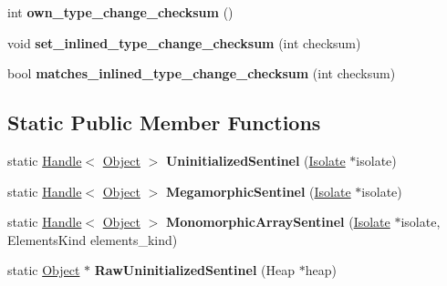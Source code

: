 \begin{DoxyCompactItemize}
\item 
\hypertarget{classv8_1_1internal_1_1_type_feedback_info_ad1d4300cf4aee1e342bb68af998ffb75}{}int {\bfseries own\+\_\+type\+\_\+change\+\_\+checksum} ()\label{classv8_1_1internal_1_1_type_feedback_info_ad1d4300cf4aee1e342bb68af998ffb75}

\item 
\hypertarget{classv8_1_1internal_1_1_type_feedback_info_ac8009b957b466a51bd9ad3d979b9c852}{}void {\bfseries set\+\_\+inlined\+\_\+type\+\_\+change\+\_\+checksum} (int checksum)\label{classv8_1_1internal_1_1_type_feedback_info_ac8009b957b466a51bd9ad3d979b9c852}

\item 
\hypertarget{classv8_1_1internal_1_1_type_feedback_info_a18b211dd8b3707184c63808439a48d71}{}bool {\bfseries matches\+\_\+inlined\+\_\+type\+\_\+change\+\_\+checksum} (int checksum)\label{classv8_1_1internal_1_1_type_feedback_info_a18b211dd8b3707184c63808439a48d71}

\end{DoxyCompactItemize}
\subsection*{Static Public Member Functions}
\begin{DoxyCompactItemize}
\item 
\hypertarget{classv8_1_1internal_1_1_type_feedback_info_a51834aa0009a3362c893a1f0b360c7d4}{}static \hyperlink{classv8_1_1internal_1_1_handle}{Handle}$<$ \hyperlink{classv8_1_1internal_1_1_object}{Object} $>$ {\bfseries Uninitialized\+Sentinel} (\hyperlink{classv8_1_1internal_1_1_isolate}{Isolate} $\ast$isolate)\label{classv8_1_1internal_1_1_type_feedback_info_a51834aa0009a3362c893a1f0b360c7d4}

\item 
\hypertarget{classv8_1_1internal_1_1_type_feedback_info_ad69912daaa06d6b9138fd2401027fb62}{}static \hyperlink{classv8_1_1internal_1_1_handle}{Handle}$<$ \hyperlink{classv8_1_1internal_1_1_object}{Object} $>$ {\bfseries Megamorphic\+Sentinel} (\hyperlink{classv8_1_1internal_1_1_isolate}{Isolate} $\ast$isolate)\label{classv8_1_1internal_1_1_type_feedback_info_ad69912daaa06d6b9138fd2401027fb62}

\item 
\hypertarget{classv8_1_1internal_1_1_type_feedback_info_a2fdd1d29df39a3860929fbcd8acab3d0}{}static \hyperlink{classv8_1_1internal_1_1_handle}{Handle}$<$ \hyperlink{classv8_1_1internal_1_1_object}{Object} $>$ {\bfseries Monomorphic\+Array\+Sentinel} (\hyperlink{classv8_1_1internal_1_1_isolate}{Isolate} $\ast$isolate, Elements\+Kind elements\+\_\+kind)\label{classv8_1_1internal_1_1_type_feedback_info_a2fdd1d29df39a3860929fbcd8acab3d0}

\item 
\hypertarget{classv8_1_1internal_1_1_type_feedback_info_a968169c1d58b7d7c5830d3f7821c75cf}{}static \hyperlink{classv8_1_1internal_1_1_object}{Object} $\ast$ {\bfseries Raw\+Uninitialized\+Sentinel} (Heap $\ast$heap)\label{classv8_1_1internal_1_1_type_feedback_info_a968169c1d58b7d7c5830d3f7821c75cf}

\end{DoxyCompactItemize}
